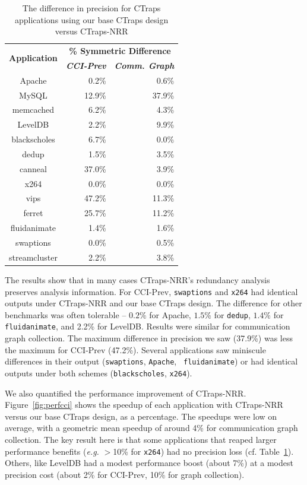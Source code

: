 \documentclass[preprint,9pt]{sigplanconf}
\newcommand{\ctraps}{CTraps\xspace}
\newcommand{\ctrapsmm}{CTraps-NRR\xspace}
\begin{document}
\begin{table}
\small
\centering
\begin{tabular}{c | r | r  }
\multirow{2}{*}{\bf Application} & \multicolumn{2}{c}{\bf \% Symmetric Difference} \\
& {\bf \em CCI-Prev} & {\bf \em Comm. Graph} \\ \hline
Apache& 0.2\% & 0.6\% \\
MySQL & 12.9\%  & 37.9\% \\
memcached  & 6.2\% & 4.3\% \\
LevelDB & 2.2\% & 9.9\% \\ \hline
blackscholes & 6.7\% & 0.0\% \\
dedup & 1.5\% & 3.5\% \\
canneal & 37.0\%  & 3.9\% \\
x264 & 0.0\% & 0.0\% \\
vips & 47.2\% & 11.3\% \\
ferret & 25.7\% & 11.2\%\\
fluidanimate & 1.4\% & 1.6\%\\
swaptions & 0.0\% & 0.5\%\\
streamcluster & 2.2\% & 3.8\%\\
\end{tabular}
\caption{\label{tab:precisionapps}The difference in precision for \ctraps applications using our base \ctraps design versus \ctrapsmm}
\end{table}


The results show that in many cases \ctrapsmm's redundancy analysis preserves
analysis information.  For CCI-Prev, {\tt swaptions} and {\tt x264} had
identical outputs under \ctrapsmm and our base \ctraps design.  The difference for other
benchmarks was often tolerable -- $0.2\%$ for Apache, $1.5$\% for {\tt dedup},
$1.4\%$ for {\tt fluidanimate}, and 2.2\% for LevelDB.  Results were similar
for communication graph collection.   The maximum difference in precision we saw (37.9\%)
was less the maximum for CCI-Prev (47.2\%).  Several applications saw
miniscule differences in their output ({\tt swaptions}, {\tt Apache}, {\tt
fluidanimate}) or had identical outputs under both schemes ({\tt blackscholes},
{\tt x264}). 


We also quantified the performance improvement of \ctrapsmm.
Figure~\ref{fig:perfcci} shows the speedup of each application with \ctrapsmm
versus our base \ctraps design, as a percentage.  The speedups were low on average, with a
geometric mean speedup of around 4\% for communication graph collection.  The
key result here is that some applications that reaped larger performance
benefits ({\em e.g.} $>$10\% for {\tt x264}) had no precision loss (cf.
Table~\ref{tab:precisionapps}).  Others, like LevelDB had a modest performance
boost (about 7\%) at a modest precision cost (about 2\% for CCI-Prev, 10\% for graph collection).  
\end{document}
